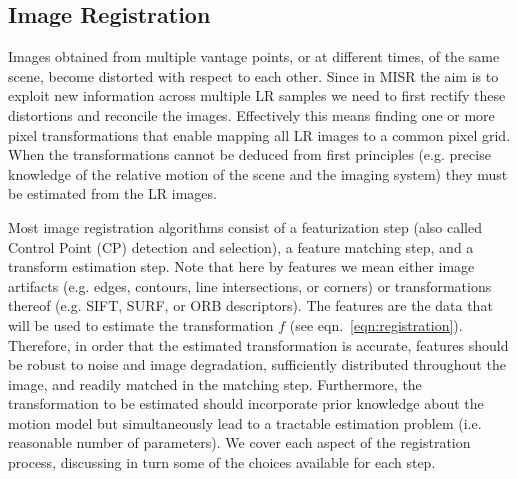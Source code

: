\subsection{Image Registration}\label{subsec:registration}
Images obtained from multiple vantage points, or at different times, of the same scene, become distorted with respect
to each other.
%
Since in MISR the aim is to exploit new information across multiple LR samples we need to first rectify these distortions and reconcile the images.
%
Effectively this means finding one or more pixel transformations that enable mapping all LR images to a common pixel grid.
%
When the transformations cannot be deduced from first principles (e.g. precise knowledge of the relative motion of the scene and the imaging system) they must be estimated from the LR images.
%

Most image registration algorithms consist of a featurization step (also called Control Point (CP) detection and selection), a feature matching step, and a transform estimation step.
%
Note that here by features we mean either image artifacts (e.g. edges, contours, line intersections, or corners) or transformations thereof (e.g. SIFT\cite{lowe2004sift}, SURF\cite{bay2006surf}, or ORB\cite{rublee2011orb} descriptors).
%
The features are the data that will be used to estimate the transformation $f$ (see eqn.~\eqref{eqn:registration}).
%
Therefore, in order that the estimated transformation is accurate, features should be robust to noise and image degradation, sufficiently distributed throughout the image, and readily matched in the matching step.
%
Furthermore, the transformation to be estimated should incorporate prior knowledge about the motion model but simultaneously lead to a tractable estimation problem (i.e. reasonable number of parameters).
%
We cover each aspect of the registration process, discussing in turn some of the choices available for each step.


